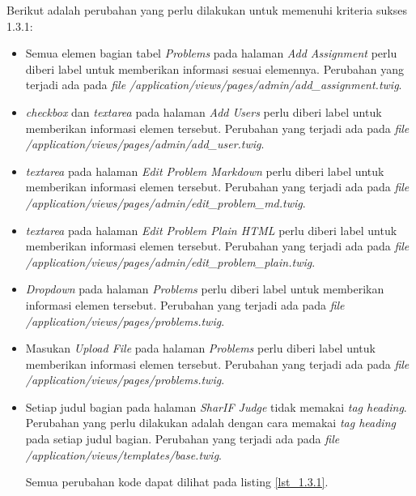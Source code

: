 Berikut adalah perubahan yang perlu dilakukan untuk memenuhi kriteria sukses 1.3.1:

\begin{itemize}
	\item Semua elemen bagian tabel \textit{Problems} pada halaman \textit{Add Assignment} perlu diberi label untuk memberikan informasi sesuai elemennya. Perubahan yang terjadi ada pada \textit{file} \textit{/application/views/pages/admin/add\_assignment.twig}.

	\item \textit{checkbox} dan \textit{textarea} pada halaman \textit{Add Users} perlu diberi label untuk memberikan informasi elemen tersebut. Perubahan yang terjadi ada pada \textit{file} \textit{/application/views/pages/admin/add\_user.twig}.

	\item \textit{textarea} pada halaman \textit{Edit Problem Markdown} perlu diberi label untuk memberikan informasi elemen tersebut. Perubahan yang terjadi ada pada \textit{file} \textit{/application/views/pages/admin/edit\_problem\_md.twig}.

	\item \textit{textarea} pada halaman \textit{Edit Problem Plain HTML} perlu diberi label untuk memberikan informasi elemen tersebut. Perubahan yang terjadi ada pada \textit{file} \textit{/application/views/pages/admin/edit\_problem\_plain.twig}.
	
	\item \textit{Dropdown} pada halaman \textit{Problems} perlu diberi label untuk memberikan informasi elemen tersebut. Perubahan yang terjadi ada pada \textit{file} \textit{/application/views/pages/problems.twig}.

	\item Masukan \textit{Upload File} pada halaman \textit{Problems} perlu diberi label untuk memberikan informasi elemen tersebut. Perubahan yang terjadi ada pada \textit{file} \textit{/application/views/pages/problems.twig}.
	
	\item Setiap judul bagian pada halaman \textit{SharIF Judge} tidak memakai \textit{tag heading}. Perubahan yang perlu dilakukan adalah dengan cara memakai \textit{tag heading} pada setiap judul bagian.
	Perubahan yang terjadi ada pada \textit{file} \textit{/application/views/templates/base.twig}.
	
	Semua perubahan kode dapat dilihat pada listing \ref{lst_1.3.1}.
	

\end{itemize}
